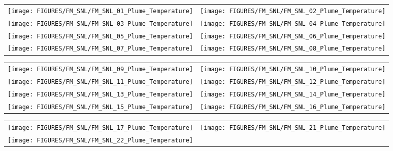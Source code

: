 \begin{figure}[p]
\begin{tabular*}{\textwidth}{l@{\extracolsep{\fill}}r}
\texttt{[image: FIGURES/FM\_SNL/FM\_SNL\_01\_Plume\_Temperature]} &
\texttt{[image: FIGURES/FM\_SNL/FM\_SNL\_02\_Plume\_Temperature]} \\
\texttt{[image: FIGURES/FM\_SNL/FM\_SNL\_03\_Plume\_Temperature]} &
\texttt{[image: FIGURES/FM\_SNL/FM\_SNL\_04\_Plume\_Temperature]} \\
\texttt{[image: FIGURES/FM\_SNL/FM\_SNL\_05\_Plume\_Temperature]} &
\texttt{[image: FIGURES/FM\_SNL/FM\_SNL\_06\_Plume\_Temperature]} \\
\texttt{[image: FIGURES/FM\_SNL/FM\_SNL\_07\_Plume\_Temperature]} &
\texttt{[image: FIGURES/FM\_SNL/FM\_SNL\_08\_Plume\_Temperature]}
\end{tabular*}
\label{FM_SNL_Plume_1}
\end{figure}

\begin{figure}[p]
\begin{tabular*}{\textwidth}{l@{\extracolsep{\fill}}r}
\texttt{[image: FIGURES/FM\_SNL/FM\_SNL\_09\_Plume\_Temperature]} &
\texttt{[image: FIGURES/FM\_SNL/FM\_SNL\_10\_Plume\_Temperature]} \\
\texttt{[image: FIGURES/FM\_SNL/FM\_SNL\_11\_Plume\_Temperature]} &
\texttt{[image: FIGURES/FM\_SNL/FM\_SNL\_12\_Plume\_Temperature]} \\
\texttt{[image: FIGURES/FM\_SNL/FM\_SNL\_13\_Plume\_Temperature]} &
\texttt{[image: FIGURES/FM\_SNL/FM\_SNL\_14\_Plume\_Temperature]} \\
\texttt{[image: FIGURES/FM\_SNL/FM\_SNL\_15\_Plume\_Temperature]} &
\texttt{[image: FIGURES/FM\_SNL/FM\_SNL\_16\_Plume\_Temperature]}
\end{tabular*}
\label{FM_SNL_Plume_2}
\end{figure}

\begin{figure}[p]
\begin{tabular*}{\textwidth}{l@{\extracolsep{\fill}}r}
\texttt{[image: FIGURES/FM\_SNL/FM\_SNL\_17\_Plume\_Temperature]} &
\texttt{[image: FIGURES/FM\_SNL/FM\_SNL\_21\_Plume\_Temperature]} \\
\texttt{[image: FIGURES/FM\_SNL/FM\_SNL\_22\_Plume\_Temperature]} &
\end{tabular*}
\label{FM_SNL_Plume_3}
\end{figure}



\clearpage

